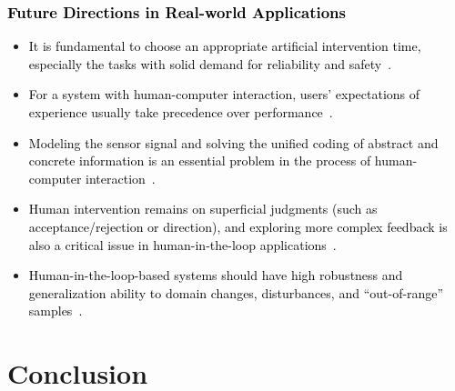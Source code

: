 \documentclass{article}
\newcommand{\REO}[1]{\textcolor{black}{#1}}
\newcommand{\ZJH}[1]{\textcolor{black}{#1}}
\begin{document}
\REO{\subsubsection{Future Directions in Real-world Applications}}
\begin{itemize}
\setlength{\itemsep}{0pt}
\setlength{\parsep}{0pt}
\setlength{\parskip}{0pt}
\item
\REO{It is fundamental to choose an appropriate artificial intervention time, especially the tasks with solid demand for reliability and safety~\cite{marquand2021automated}.}

\item
\REO{For a system with human-computer interaction, users' expectations of experience usually take precedence over performance~\cite{dudley2018review,shilton2018values}.}
\item
\REO{Modeling the sensor signal and solving the unified coding of abstract and concrete information is an essential problem in the process of human-computer interaction~\cite{jolfaei2022guest}.}
\item
\REO{Human intervention remains on superficial judgments (such as acceptance/rejection or direction), and exploring more complex feedback is also a critical issue in \ZJH{human-in-the-loop} applications~\cite{xu2022transitioning}.}
\item
\REO{Human-in-the-loop-based systems should have high robustness and generalization ability to domain changes, disturbances, and ``out-of-range'' samples~\cite{zhou2021domain}.}
\end{itemize}


\section{Conclusion}
\label{sec:conclusion}
\end{document}
